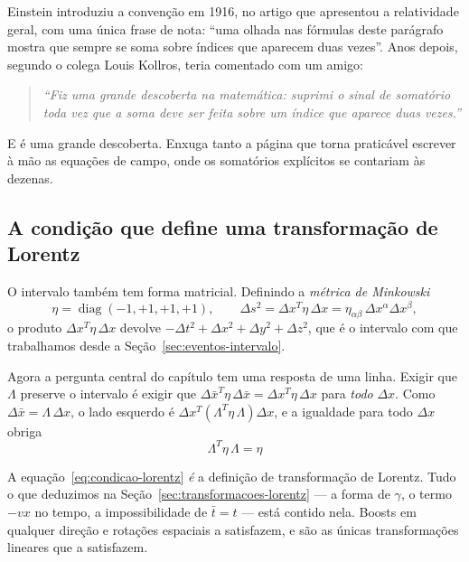 \documentclass[12pt,a4paper,oneside]{book}
\theoremstyle{rgplain}
\theoremstyle{rgremark}
\begin{document}
\begin{roteiro}[title={\sffamily\bfseries\footnotesize\color{rgGrafite}CURIOSIDADE}]
Einstein introduziu a convenção em 1916, no artigo que apresentou a
relatividade geral, com uma única frase de nota: ``uma olhada nas fórmulas
deste parágrafo mostra que sempre se soma sobre índices que aparecem duas
vezes''. Anos depois, segundo o colega Louis Kollros, teria comentado com um
amigo:
\begin{quote}
\emph{``Fiz uma grande descoberta na matemática: suprimi o sinal de somatório
toda vez que a soma deve ser feita sobre um índice que aparece duas vezes.''}
\end{quote}
E é uma grande descoberta. Enxuga tanto a página que torna praticável escrever
à mão as equações de campo, onde os somatórios explícitos se contariam às
dezenas.
\end{roteiro}

\subsection*{A condição que define uma transformação de Lorentz}

O intervalo também tem forma matricial. Definindo a \emph{métrica de Minkowski}
\begin{equation}
  \eta=\operatorname{diag}(-1,+1,+1,+1),
  \qquad
  \Delta s^2=\Delta x^{T}\eta\,\Delta x
  =\eta_{\alpha\beta}\,\Delta x^{\alpha}\Delta x^{\beta},
  \label{eq:metrica-minkowski}
\end{equation}
o produto $\Delta x^{T}\eta\,\Delta x$ devolve $-\Delta t^2+\Delta x^2+\Delta
y^2+\Delta z^2$, que é o intervalo com que trabalhamos desde a
Seção~\ref{sec:eventos-intervalo}.

Agora a pergunta central do capítulo tem uma resposta de uma linha. Exigir que
$\Lambda$ preserve o intervalo é exigir que $\Delta \bar x^{T}\eta\,\Delta \bar x=\Delta
x^{T}\eta\,\Delta x$ para \emph{todo} $\Delta x$. Como $\Delta \bar x=\Lambda\,\Delta
x$, o lado esquerdo é $\Delta x^{T}(\Lambda^{T}\eta\,\Lambda)\Delta x$, e a
igualdade para todo $\Delta x$ obriga
\begin{equation}
  \boxed{\;\Lambda^{T}\eta\,\Lambda=\eta\;}
  \label{eq:condicao-lorentz}
\end{equation}

\begin{central}
A equação~\eqref{eq:condicao-lorentz} \emph{é} a definição de transformação de
Lorentz. Tudo o que deduzimos na Seção~\ref{sec:transformacoes-lorentz} --- a forma de
$\gamma$, o termo $-vx$ no tempo, a impossibilidade de $\bar t=t$ --- está contido
nela. Boosts em qualquer direção e rotações espaciais a satisfazem, e são as
únicas transformações lineares que a satisfazem.
\end{central}
\end{document}
